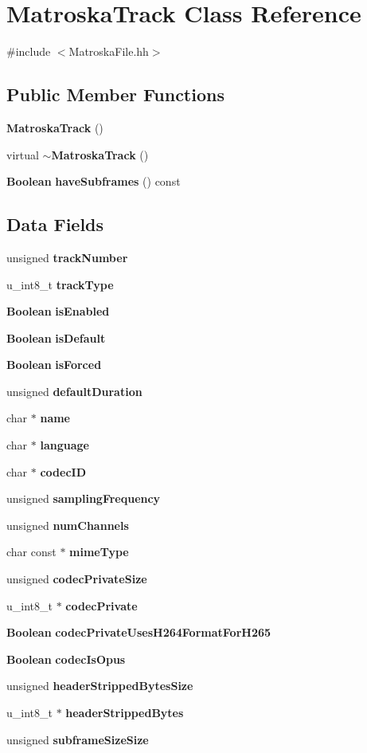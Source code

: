 \section{Matroska\+Track Class Reference}
\label{classMatroskaTrack}


{\ttfamily \#include $<$Matroska\+File.\+hh$>$}

\subsection*{Public Member Functions}
\begin{DoxyCompactItemize}
\item 
{\bf Matroska\+Track} ()
\item 
virtual {\bf $\sim$\+Matroska\+Track} ()
\item 
{\bf Boolean} {\bf have\+Subframes} () const 
\end{DoxyCompactItemize}
\subsection*{Data Fields}
\begin{DoxyCompactItemize}
\item 
unsigned {\bf track\+Number}
\item 
u\+\_\+int8\+\_\+t {\bf track\+Type}
\item 
{\bf Boolean} {\bf is\+Enabled}
\item 
{\bf Boolean} {\bf is\+Default}
\item 
{\bf Boolean} {\bf is\+Forced}
\item 
unsigned {\bf default\+Duration}
\item 
char $\ast$ {\bf name}
\item 
char $\ast$ {\bf language}
\item 
char $\ast$ {\bf codec\+I\+D}
\item 
unsigned {\bf sampling\+Frequency}
\item 
unsigned {\bf num\+Channels}
\item 
char const $\ast$ {\bf mime\+Type}
\item 
unsigned {\bf codec\+Private\+Size}
\item 
u\+\_\+int8\+\_\+t $\ast$ {\bf codec\+Private}
\item 
{\bf Boolean} {\bf codec\+Private\+Uses\+H264\+Format\+For\+H265}
\item 
{\bf Boolean} {\bf codec\+Is\+Opus}
\item 
unsigned {\bf header\+Stripped\+Bytes\+Size}
\item 
u\+\_\+int8\+\_\+t $\ast$ {\bf header\+Stripped\+Bytes}
\item 
unsigned {\bf subframe\+Size\+Size}
\end{DoxyCompactItemize}


